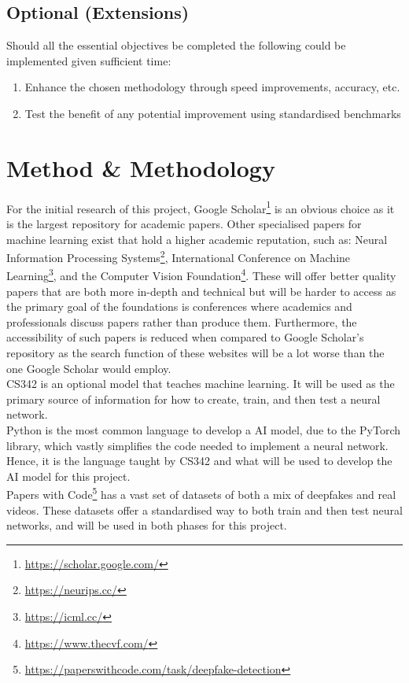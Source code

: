 \documentclass{article}
\begin{document}
\subsection{Optional (Extensions)}
Should all the essential objectives be completed the following could be implemented given sufficient time:
\begin{enumerate}
    \item Enhance the chosen methodology through speed improvements, accuracy, etc.
    \item Test the benefit of any potential improvement using standardised benchmarks
\end{enumerate}

\section{Method \& Methodology}

For the initial research of this project, Google Scholar\footnote{\url{https://scholar.google.com/}} is an obvious choice as it is the largest repository for academic papers. Other specialised papers for machine learning exist that hold a higher academic reputation, such as: Neural Information Processing Systems\footnote{\url{https://neurips.cc/}},  International Conference on Machine Learning\footnote{\url{https://icml.cc/}}, and the Computer Vision Foundation\footnote{\url{https://www.thecvf.com/}}. These will offer better quality papers that are both more in-depth and technical but will be harder to access as the primary goal of the foundations is conferences where academics and professionals discuss papers rather than produce them. Furthermore, the accessibility of such papers is reduced when compared to Google Scholar's repository as the search function of these websites will be a lot worse than the one Google Scholar would employ.\\

CS342 is an optional model that teaches machine learning. It will be used as the primary source of information for how to create, train, and then test a neural network.\\

Python is the most common language to develop a AI model, due to the PyTorch library, which vastly simplifies the code needed to implement a neural network. Hence, it is the language taught by CS342 and what will be used to develop the AI model for this project.\\

Papers with Code\footnote{\url{https://paperswithcode.com/task/deepfake-detection}} has a vast set of datasets of both a mix of deepfakes and real videos. These datasets offer a standardised way to both train and then test neural networks, and will be used in both phases for this project.\\
\end{document}
